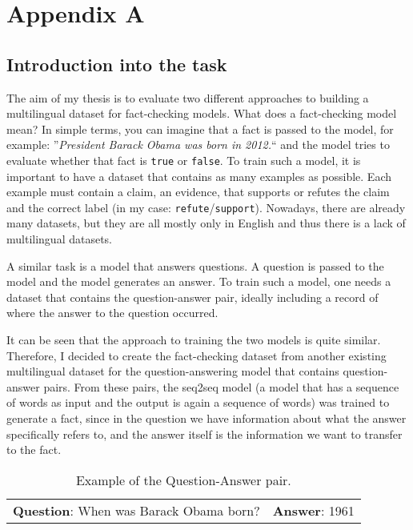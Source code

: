 \newpage
\section*{Appendix A} \label{apendix_a}

\subsection*{Introduction into the task}
The aim of my thesis is to evaluate two different approaches to building a multilingual dataset for fact-checking models.
What does a fact-checking model mean? In simple terms, you can imagine that a fact is passed to the model, for example: ''\textit{President Barack Obama was born in 2012.}`` and the model tries to evaluate whether that fact is \texttt{true} or \texttt{false}. To train such a model, it is important to have a dataset that contains as many examples as possible. Each example must contain a claim, an evidence, that supports or refutes the claim and the correct label (in my case: \texttt{refute}/\texttt{support}). Nowadays, there are already many datasets, but they are all mostly only in English and thus there is a lack of multilingual datasets.

A similar task is a model that answers questions. A question is passed to the model and the model generates an answer. To train such a model, one needs a dataset that contains the question-answer pair, ideally including a record of where the answer to the question occurred.

It can be seen that the approach to training the two models is quite similar. Therefore, I decided to create the fact-checking dataset from another existing multilingual dataset for the question-answering model that contains question-answer pairs. From these pairs, the seq2seq model (a model that has a sequence of words as input and the output is again a sequence of words) was trained to generate a fact, since in the question we have information about what the answer specifically refers to, and the answer itself is the information we want to transfer to the fact.
\begin{table}[h]
    \centering
    \begin{tabular}{cc}
     \textbf{Question}: When was Barack Obama born? & \textbf{Answer}: 1961 \\
    \end{tabular}
    \caption{Example of the Question-Answer pair.}
\end{table}

